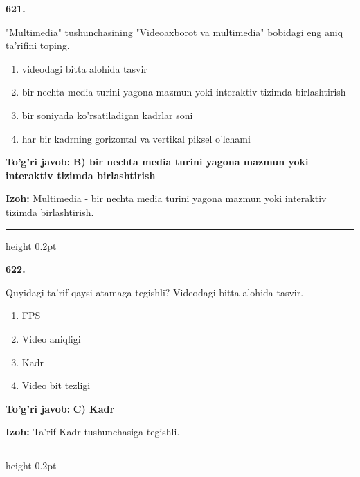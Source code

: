 \documentclass[10pt,a4paper,oneside]{article}
\begin{document}
\noindent\textbf{\color{ink}621.}
\par
"Multimedia" tushunchasining "Videoaxborot va multimedia" bobidagi eng aniq ta'rifini toping.
\begin{enumerate}[label=\Alph*),leftmargin=9mm]
\item videodagi bitta alohida tasvir
\item bir nechta media turini yagona mazmun yoki interaktiv tizimda birlashtirish
\item bir soniyada ko'rsatiladigan kadrlar soni
\item har bir kadrning gorizontal va vertikal piksel o'lchami
\end{enumerate}
\begin{tcolorbox}[enhanced,breakable,colback=teal!4,colframe=teal!50!black,boxrule=0.5pt,arc=1.1mm,left=3mm,right=3mm,top=1.7mm,bottom=1.7mm,before skip=2mm,after skip=2mm]
\textbf{\color{teal}To'g'ri javob:} \textbf{B) bir nechta media turini yagona mazmun yoki interaktiv tizimda birlashtirish}
\par\smallskip
\textbf{Izoh:} Multimedia - bir nechta media turini yagona mazmun yoki interaktiv tizimda birlashtirish.
\end{tcolorbox}
\vspace{2mm}\hrule height 0.2pt \vspace{3mm}

\noindent\textbf{\color{ink}622.}
\par
Quyidagi ta'rif qaysi atamaga tegishli? Videodagi bitta alohida tasvir.
\begin{enumerate}[label=\Alph*),leftmargin=9mm]
\item FPS
\item Video aniqligi
\item Kadr
\item Video bit tezligi
\end{enumerate}
\begin{tcolorbox}[enhanced,breakable,colback=teal!4,colframe=teal!50!black,boxrule=0.5pt,arc=1.1mm,left=3mm,right=3mm,top=1.7mm,bottom=1.7mm,before skip=2mm,after skip=2mm]
\textbf{\color{teal}To'g'ri javob:} \textbf{C) Kadr}
\par\smallskip
\textbf{Izoh:} Ta'rif Kadr tushunchasiga tegishli.
\end{tcolorbox}
\vspace{2mm}\hrule height 0.2pt \vspace{3mm}
\end{document}

